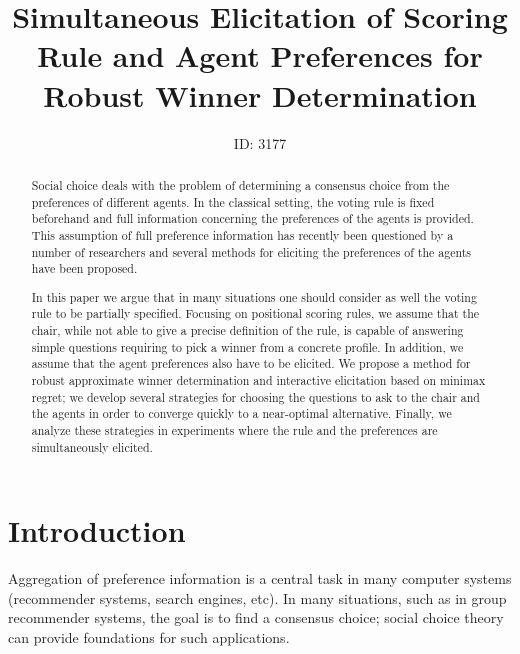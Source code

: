 \documentclass{article}
\title{Simultaneous Elicitation of Scoring Rule and Agent Preferences for Robust Winner Determination}
\author{ID: 3177}
\begin{document}
\maketitle 

\begin{abstract}
Social choice deals with the problem of determining a consensus choice from the preferences of different agents.
In the classical setting, the voting rule is fixed beforehand and full information concerning the preferences of the agents is provided.
This assumption of full preference information has recently been questioned by a number of researchers and
	several methods for eliciting the preferences of the agents have been proposed.

In this paper we argue that in many situations one should consider as well the voting rule to be 	partially specified.
	Focusing on positional scoring rules, we assume that the chair, while not able to give a precise definition of the rule, is capable of answering simple questions requiring to pick a winner from a concrete profile. In addition, we assume that the agent preferences also have to be elicited. %
	We propose a method for robust approximate winner determination and interactive elicitation based on minimax regret; we develop several strategies for choosing the questions to ask to  the chair and the agents in order to %
converge quickly to a near-optimal alternative. Finally, we analyze these strategies in experiments %
 where the  rule and the preferences are simultaneously elicited.
\end{abstract}

\section{Introduction}
Aggregation of preference information is a central task in many computer systems (recommender systems, search engines, etc).
In many situations, such as in group recommender systems, the goal is to find a consensus choice;
social choice theory can provide foundations for such applications. %
\end{document}
